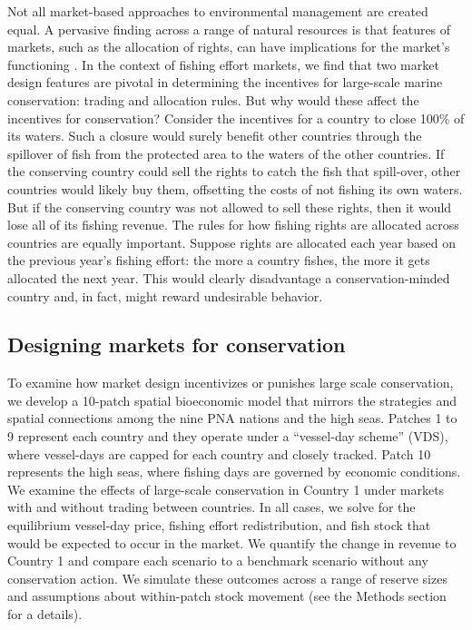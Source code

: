 \documentclass[12pt]{article}
\begin{document}
Not all market-based approaches to environmental management are created equal. A pervasive finding across a range of natural resources is that features of markets, such as the allocation of rights, can have implications for the market's functioning \cite{libecap_1989}. In the context of fishing effort markets, we find that two market design features are pivotal in determining the incentives for large-scale marine conservation: trading and allocation rules. But why would these affect the incentives for conservation? Consider the incentives for a country to close 100\% of its waters. Such a closure would surely benefit other countries through the spillover of fish from the protected area to the waters of the other countries. If the conserving country could sell the rights to catch the fish that spill-over, other countries would likely buy them, offsetting the costs of not fishing its own waters. But if the conserving country was not allowed to sell these rights, then it would lose all of its fishing revenue. The rules for how fishing rights are allocated across countries are equally important. Suppose rights are allocated each year based on the previous year's fishing effort: the more a country fishes, the more it gets allocated the next year. This would clearly disadvantage a conservation-minded country and, in fact, might reward undesirable behavior.

\subsection{Designing markets for conservation}

To examine how market design incentivizes or punishes large scale conservation, we develop a 10-patch spatial bioeconomic model that mirrors the strategies and spatial connections among the nine PNA nations and the high seas. Patches 1 to 9 represent each country and they operate under a ``vessel-day scheme'' (VDS), where vessel-days are capped for each country and closely tracked. Patch 10 represents the high seas, where fishing days are governed by economic conditions. We examine the effects of large-scale conservation in Country 1 under markets with and without trading between countries. In all cases, we solve for the equilibrium vessel-day price, fishing effort redistribution, and fish stock that would be expected to occur in the market. We quantify the change in revenue to Country 1 and compare each scenario to a benchmark scenario without any conservation action. We simulate these outcomes across a range of reserve sizes and assumptions about within-patch stock movement (see the Methods section for a details).
\end{document}
